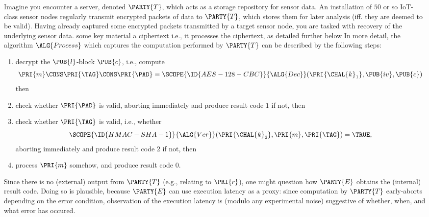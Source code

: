 %



Imagine you encounter a server, denoted 
$\PARTY{T}$, 
which acts as a storage repository for sensor data.  An installation of $50$ 
or so IoT-class sensor nodes regularly transmit encrypted packets of data to
$\PARTY{T}$, 
which stores them for later analysis (iff. they are deemed to be valid).  
Having already captured some encrypted packets transmitted by a target sensor
node, you are tasked with recovery of the underlying sensor data.
\DESCINTRO[none]
{}
{some key material}
{a ciphertext}
{i.e., it processes the ciphertext, as detailed further below}
{}
In more detail, the algorithm
$\ALG{Process}$
which captures the computation performed by
$\PARTY{T}$
can be described by the following steps:

\begin{enumerate}
\item decrypt the $\PUB{l}$-block $\PUB{c}$, i.e., compute
      \[
      \PRI{m} \CONS \PRI{\TAG} \CONS \PRI{\PAD} = \SCOPE{\ID{AES-128-CBC}}{\ALG{Dec}}( \PRI{\CHAL{k}_1}, \PUB{iv}, \PUB{c} )
      \]
      then
\item check whether $\PRI{\PAD}$ is valid, 
      aborting immediately  and produce result code $1$ if not,
      then
\item check whether $\PRI{\TAG}$ is valid, i.e., whether 
      \[
      \SCOPE{\ID{HMAC-SHA-1}}{\ALG{Ver}}( \PRI{\CHAL{k}_2}, \PRI{m}, \PRI{\TAG} ) = \TRUE ,
      \]
      aborting immediately  and produce result code $2$ if not,
      then
\item process $\PRI{m}$ somehow,
                            and produce result code $0$.
\end{enumerate}

\noindent
Since there is no (external) output from
$\PARTY{T}$
(e.g., relating to $\PRI{r}$), 
one might question how
$\PARTY{E}$
obtains the (internal) result code.  Doing so is plausible, because 
$\PARTY{E}$
can use execution latency as a proxy: since computation by
$\PARTY{T}$
early-aborts depending on the error condition, observation of the execution
latency is (modulo any experimental noise) suggestive of whether, when, and 
what error has occured.

